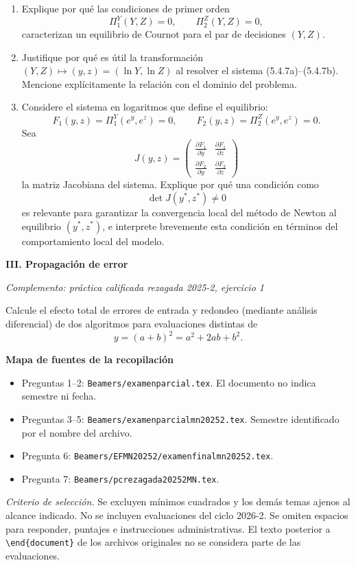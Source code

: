 \documentclass[11pt,a4paper]{article}
\newcommand{\pregunta}[3]{\par\medskip{\large\bfseries\color{azul}#1. #2}\par
{\small\itshape #3}\par\smallskip}
\begin{document}
\begin{enumerate}
    \item Explique por qué las condiciones de primer orden
    \[
    \Pi^Y_1(Y,Z)=0, \qquad \Pi^Z_2(Y,Z)=0,
    \]
    caracterizan un equilibrio de Cournot para el par de decisiones $(Y,Z)$.
    

    \item Justifique por qué es útil la transformación $(Y,Z)\mapsto (y,z)=(\ln Y,\ln Z)$
    al resolver el sistema (5.4.7a)--(5.4.7b).  
    Mencione explícitamente la relación con el dominio del problema.
    

    \item Considere el sistema en logaritmos que define el equilibrio:
    \[
    F_1(y,z)=\Pi^Y_1(e^y,e^z)=0, 
    \qquad
    F_2(y,z)=\Pi^Z_2(e^y,e^z)=0.
    \]
    Sea
    \[
    J(y,z)=
    \begin{pmatrix}
    \frac{\partial F_1}{\partial y} & \frac{\partial F_1}{\partial z}\\[4pt]
    \frac{\partial F_2}{\partial y} & \frac{\partial F_2}{\partial z}
    \end{pmatrix}
    \]
    la matriz Jacobiana del sistema.  
    Explique por qué una condición como
    \[
    \det J(y^\ast,z^\ast)\neq 0
    \]
    es relevante para garantizar la convergencia local del método de Newton al equilibrio
    $(y^\ast,z^\ast)$, e interprete brevemente esta condición en términos del comportamiento
    local del modelo.
    
\end{enumerate}

\newpage

\textbf{III. Propagación de error}\par\smallskip

\pregunta{7}{Errores de entrada y redondeo}{Complemento: práctica calificada rezagada 2025-2, ejercicio 1}
Calcule el efecto total de errores de entrada y redondeo (mediante an\'alisis
diferencial) de dos algoritmos para evaluaciones distintas de
$$ y = (a + b)^2 = a^2 + 2ab + b^2. $$

\medskip
\textbf{Mapa de fuentes de la recopilación}
\begin{itemize}[leftmargin=5mm,itemsep=5pt]
\item Preguntas 1--2: \texttt{Beamers/examenparcial.tex}. El documento no indica semestre ni fecha.
\item Preguntas 3--5: \texttt{Beamers/examenparcialmn20252.tex}. Semestre identificado por el nombre del archivo.
\item Pregunta 6: \texttt{Beamers/EFMN20252/}\allowbreak\texttt{examenfinalmn20252.tex}.
\item Pregunta 7: \texttt{Beamers/pcrezagada20252MN.tex}.
\end{itemize}
\textit{Criterio de selección.} Se excluyen mínimos cuadrados y los demás temas ajenos al alcance indicado. No se incluyen evaluaciones del ciclo 2026-2. Se omiten espacios para responder, puntajes e instrucciones administrativas. El texto posterior a \texttt{\textbackslash end\{document\}} de los archivos originales no se considera parte de las evaluaciones.
\end{document}
